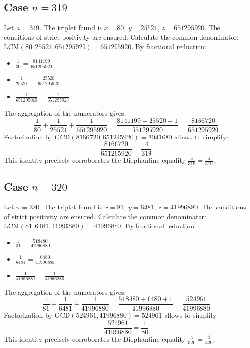 \documentclass[11pt,a4paper]{article}
\begin{document}
\subsection{Case $n = 319$}
Let $n = 319$. The triplet found is $x = 80$, $y = 25521$, $z = 651295920$.
The conditions of strict positivity are ensured.
Calculate the common denominator: $\text{LCM}(80, 25521, 651295920) = 651295920$.
By fractional reduction:
\begin{itemize}
    \item $\frac{1}{80} = \frac{8141199}{651295920}$
    \item $\frac{1}{25521} = \frac{25520}{651295920}$
    \item $\frac{1}{651295920} = \frac{1}{651295920}$
\end{itemize}
The aggregation of the numerators gives:
$$ \frac{1}{80} + \frac{1}{25521} + \frac{1}{651295920} = \frac{8141199 + 25520 + 1}{651295920} = \frac{8166720}{651295920} $$
Factorization by $\text{GCD}(8166720, 651295920) = 2041680$ allows to simplify:
$$ \frac{8166720}{651295920} = \frac{4}{319} $$
This identity precisely corroborates the Diophantine equality $\frac{4}{319} = \frac{4}{319}$.

\subsection{Case $n = 320$}
Let $n = 320$. The triplet found is $x = 81$, $y = 6481$, $z = 41996880$.
The conditions of strict positivity are ensured.
Calculate the common denominator: $\text{LCM}(81, 6481, 41996880) = 41996880$.
By fractional reduction:
\begin{itemize}
    \item $\frac{1}{81} = \frac{518480}{41996880}$
    \item $\frac{1}{6481} = \frac{6480}{41996880}$
    \item $\frac{1}{41996880} = \frac{1}{41996880}$
\end{itemize}
The aggregation of the numerators gives:
$$ \frac{1}{81} + \frac{1}{6481} + \frac{1}{41996880} = \frac{518480 + 6480 + 1}{41996880} = \frac{524961}{41996880} $$
Factorization by $\text{GCD}(524961, 41996880) = 524961$ allows to simplify:
$$ \frac{524961}{41996880} = \frac{1}{80} $$
This identity precisely corroborates the Diophantine equality $\frac{4}{320} = \frac{4}{320}$.
\end{document}
